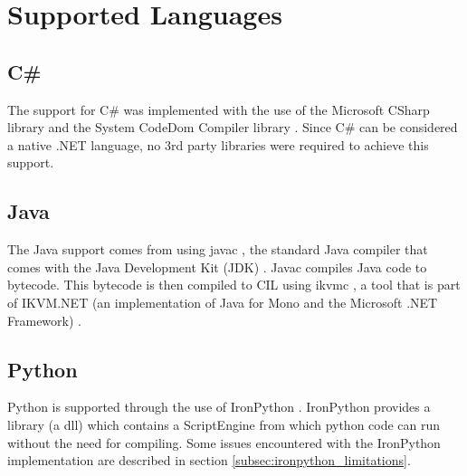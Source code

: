\section{Supported Languages}

\subsection{C\#}
The support for C\# was implemented with the use of the Microsoft CSharp library \cite{MicrosoftCSharp} and the System CodeDom Compiler library \cite{CodeDomCompiler}. Since C\# can be considered a native .NET language, no 3rd party libraries were required to achieve this support.

\subsection{Java}
The Java support comes from using javac \cite{Javac}, the standard Java compiler that comes with the Java Development Kit (JDK) \cite{JDK}. Javac compiles Java code to bytecode. This bytecode is then compiled to CIL using ikvmc \cite{IKVMC}, a tool that is part of IKVM.NET (an implementation of Java for Mono and the Microsoft .NET Framework) \cite{IKVM.NET}.

\subsection{Python}
Python is supported through the use of IronPython \cite{IronPython}. IronPython provides a library (a dll) which contains a ScriptEngine from which python code can run without the need for compiling. Some issues encountered with the IronPython implementation are described in section \ref{subsec:ironpython_limitations}.

